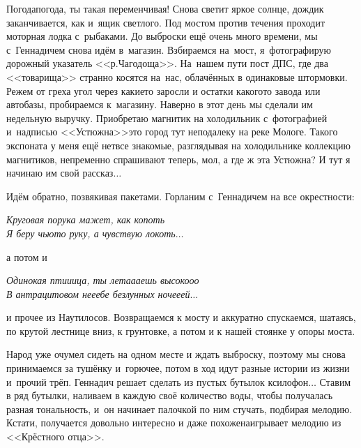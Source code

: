 Погода\sdash погода, ты такая переменчивая! Снова светит яркое солнце, дождик заканчивается, как и~ящик светлого. Под мостом против течения проходит моторная лодка с~рыбаками. До выброски ещё очень много времени, мы с~Геннадичем снова идём в~магазин.  Взбираемся на~мост, я~фотографирую дорожный указатель <<р.\thinspace Чагодоща>>. На~нашем пути пост ДПС, где два <<товарища>> странно косятся на~нас, облачённых в одинаковые штормовки. Режем от греха угол через какие\sdash то заросли и остатки какого\sdash то завода или автобазы, пробираемся к~магазину. Наверно в этот день мы сделали им недельную выручку. Приобретаю магнитик на холодильник с~фотографией и~надписью <<Устюжна>>\mdash это город тут неподалеку на реке Мологе. Такого экспоната у меня ещё нет\mdash все знакомые, разглядывая на холодильнике коллекцию магнитиков, непременно спрашивают теперь, мол, а где ж эта Устюжна? И тут я начинаю им свой рассказ$\ldots$

Идём обратно, позвякивая пакетами. Горланим с~Геннадичем на все окрестности: 

\noindent\textit{%
	\hspace*{1.2cm}Круговая порука мажет, как копоть\mdash \\
	\hspace*{1.2cm}Я беру чью\sdash то руку, а чувствую локоть$\ldots$
}

\noindent а потом и 

\noindent\textit{%
	\hspace*{1.2cm}Одинокая пти\sdash и\sdash ица, ты лета\sdash а\sdash аешь высоко\sdash о\sdash о\\
	\hspace*{1.2cm}В антрацитовом не\sdash е\sdash ебе безлунных ноче\sdash е\sdash ей$\ldots$
}

\noindent и прочее из Наутилосов.
Возвращаемся к мосту и аккуратно спускаемся, шатаясь, по крутой лестнице вниз, к грунтовке, а потом и к нашей стоянке у опоры моста. 

Народ уже очумел сидеть на одном месте и ждать выброску, поэтому мы снова принимаемся за тушёнку и~горючее, потом в ход идут разные истории из жизни и~прочий трёп. Геннадич решает сделать из пустых бутылок ксилофон$\ldots$ Ставим в ряд бутылки, наливаем в каждую своё количество воды, чтобы получалась разная тональность, и~он начинает палочкой по ним стучать, подбирая мелодию. Кстати, получается довольно интересно и даже похоже\mdash наигрывает мелодию из <<Крёстного отца>>. 

